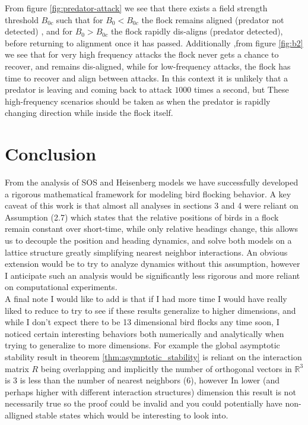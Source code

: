 \documentclass[11pt,a4paper]{article}
\numberwithin{equation}{section}
\newcommand{\R}{\mathbb{R}}
\theoremstyle{definition}
\theoremstyle{assumption}
\begin{document}
From figure \ref{fig:predator-attack} we see that there exists a 
field strength threshold $B_{0c}$ such that for $B_0 < B_{0c}$ the flock remains aligned (predator not detected)
, and for $B_0 > B_{0c}$ the flock rapidly dis-aligns (predator detected), before returning to alignment once it has passed. 
Additionally ,from figure \ref{fig:b2} we see that for very high frequency attacks the flock never gets a chance to recover, 
and remains dis-aligned, while for low-frequency attacks, the flock has time to recover and align between attacks.
In this context it is unlikely that a predator is leaving and coming back to attack $1000$ times a second, but 
These high-frequency scenarios should be taken as when the predator is rapidly changing direction while inside the flock itself.

\section{Conclusion}
From the analysis of SOS and Heisenberg models we 
have successfully developed a rigorous mathematical 
framework for modeling bird flocking behavior. A key caveat of this work is that 
almost all analyses in sections 3 and 4 were reliant on Assumption (2.7) which states that the relative positions 
of birds in a flock remain constant over short-time, while only relative headings change, this allows us to decouple the position and heading dynamics, 
and solve both models on a lattice structure greatly simplifying nearest neighbor interactions. An obvious extension would be
to try to analyze dynamics without this assumption, however I anticipate such an analysis would be significantly less rigorous
and more reliant on computational experiments.
\\

A final note I would like to add is that if I had more time 
I would have really liked to reduce to try to see if these results generalize to 
higher dimensions, and while I don't expect there to be 13 dimensional bird flocks any time soon, I noticed 
certain interesting behaviors both numerically and analytically when trying to generalize to more dimensions. For 
example the global asymptotic stability result in theorem \ref{thm:asymptotic_stability} is reliant on 
the interaction matrix $R$ being overlapping and implicitly the number of orthogonal vectors in $\R^3$ is 3 is less than the number of nearest neighbors (6), however In
lower (and perhaps higher with different interaction structures) dimension this result is not necessarily true 
so the proof could be invalid and you could potentially have non-alligned stable states which would be interesting to look into. 
\end{document}
